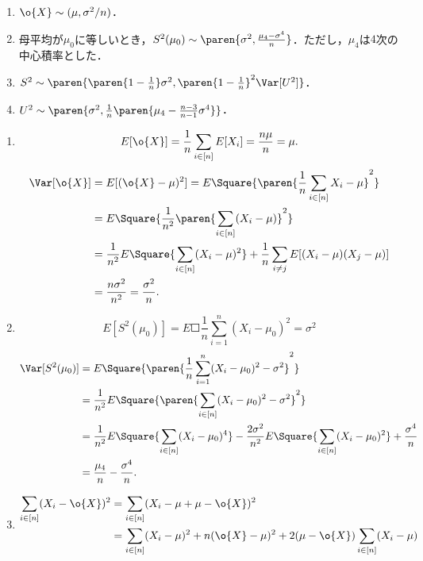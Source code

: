\documentclass[uplatex,dvipdfmx]{jsreport}
\begin{document}
\begin{proposition}\mbox{}
    \begin{enumerate}
        \item $\o{X}\sim(\mu,\sigma^2/n)$．
        \item 母平均が$\mu_0$に等しいとき，$S^2(\mu_0)\sim\paren{\sigma^2,\frac{\mu_4-\sigma^4}{n}}$．ただし，$\mu_4$は$4$次の中心積率とした．
        \item $S^2\sim\paren{\paren{1-\frac{1}{n}}\sigma^2,\paren{1-\frac{1}{n}}^2\Var[U^2]}$．
        \item $U^2\sim\paren{\sigma^2,\frac{1}{n}\paren{\mu_4-\frac{n-3}{n-1}\sigma^4}}$．
    \end{enumerate}
\end{proposition}
\begin{Proof}\mbox{}
    \begin{enumerate}
        \item \[E[\o{X}]=\frac{1}{n}\sum_{i\in[n]}E[X_i]=\frac{n\mu}{n}=\mu.\]
        \begin{align*}
            \Var[\o{X}]&=E[(\o{X}-\mu)^2]=E\Square{\paren{\frac{1}{n}\sum_{i\in[n]}X_i-\mu}^2}\\
            &=E\Square{\frac{1}{n^2}\paren{\sum_{i\in[n]}(X_i-\mu)}^2}\\
            &=\frac{1}{n^2}E\Square{\sum_{i\in[n]}(X_i-\mu)^2}+\frac{1}{n}\sum_{i\ne j}E[(X_i-\mu)(X_j-\mu)]\\
            &=\frac{n\sigma^2}{n^2}=\frac{\sigma^2}{n}.
        \end{align*}
        \item \[E[S^2(\mu_0)]=E\Square{\frac{1}{n}\sum_{i=1}^n(X_i-\mu_0)^2}=\sigma^2\]
        \begin{align*}
            \Var[S^2(\mu_0)]&=E\Square{\paren{\frac{1}{n}\sum_{i=1}^n(X_i-\mu_0)^2-\sigma^2}^2}\\
            &=\frac{1}{n^2}E\Square{\paren{\sum_{i\in[n]}(X_i-\mu_0)^2-\sigma^2}^2}\\
            &=\frac{1}{n^2}E\Square{\sum_{i\in[n]}(X_i-\mu_0)^4}-\frac{2\sigma^2}{n^2}E\Square{\sum_{i\in[n]}(X_i-\mu_0)^2}+\frac{\sigma^4}{n}\\
            &=\frac{\mu_4}{n}-\frac{\sigma^4}{n}.
        \end{align*}
        \item \begin{align*}
            \sum_{i\in[n]}(X_i-\o{X})^2&=\sum_{i\in[n]}(X_i-\mu+\mu-\o{X})^2\\
            &=\sum_{i\in[n]}(X_i-\mu)^2+n(\o{X}-\mu)^2+2(\mu-\o{X})\sum_{i\in[n]}(X_i-\mu)\\

\end{align*}
\end{enumerate}
\end{Proof}
\end{document}
